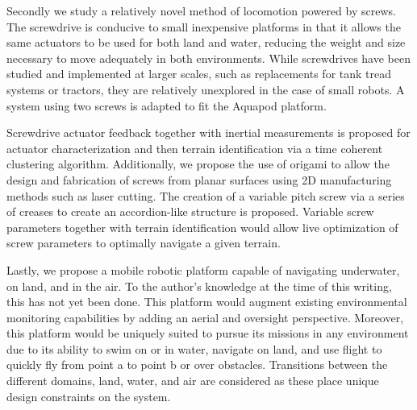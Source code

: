 Secondly we study a relatively novel method of locomotion powered by screws. The screwdrive is conducive to small inexpensive platforms in that it allows the same actuators to be used for both land and water, reducing the weight and size necessary to move adequately in both environments. While screwdrives have been studied and implemented at larger scales, such as replacements for tank tread systems or tractors, they are relatively unexplored in the case of small robots. A system using two screws is adapted to fit the Aquapod platform. 

Screwdrive actuator feedback together with inertial measurements is proposed for actuator characterization and then terrain identification via a time coherent clustering algorithm. Additionally, we propose the use of origami to allow the design and fabrication of screws from planar surfaces using 2D manufacturing methods such as laser cutting. The creation of a variable pitch screw via a series of creases to create an accordion-like structure is proposed. Variable screw parameters together with terrain identification would allow live optimization of screw parameters to optimally navigate a given terrain. 

Lastly, we propose a mobile robotic platform capable of navigating underwater, on land, and in the air. To the author's knowledge at the time of this writing, this has not yet been done. This platform would augment existing environmental monitoring capabilities by adding an aerial and oversight perspective. Moreover, this platform would be uniquely suited to pursue its missions in any environment due to its ability to swim on or in water, navigate on land, and use flight to quickly fly from point a to point b or over obstacles. Transitions between the different domains, land, water, and air are considered as these place unique design constraints on the system. 










